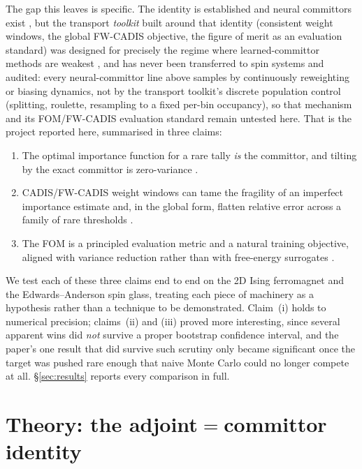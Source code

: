 \documentclass[11pt]{article}
\begin{document}
	The gap this leaves is specific. The identity is established \cite{doob1984, chetrite2015}
	and neural committors exist \cite{li2019, khoo2019, kim2026, trizio2025}, but the transport
	\emph{toolkit} built around that identity (consistent weight windows, the global
	FW-CADIS objective, the figure of merit as an evaluation standard) was designed for
	precisely the regime where learned-committor methods are weakest \cite{wagner1998,
		wagnerfw2014}, and has never been transferred to spin systems and audited: every
	neural-committor line above samples by continuously reweighting or biasing dynamics, not
	by the transport toolkit's discrete population control (splitting, roulette, resampling
	to a fixed per-bin occupancy), so that mechanism and its FOM/FW-CADIS evaluation standard
	remain untested here. That is the project reported here, summarised in three claims:
	\begin{enumerate}[itemsep=2pt]
		\item The optimal importance function for a rare tally \emph{is} the committor, and
		tilting by the exact committor is zero-variance \cite{doob1984, chetrite2015}.
		\item CADIS/FW-CADIS weight windows can tame the fragility of an imperfect importance
		estimate and, in the global form, flatten relative error across a family of rare
		thresholds \cite{wagner1998, wagnerfw2014}.
		\item The FOM is a principled evaluation metric and a natural training objective,
		aligned with variance reduction rather than with free-energy surrogates
		\cite{spanier1969, wanglandau2001}.
	\end{enumerate}
	
	We test each of these three claims end to end on the 2D Ising ferromagnet and the
	Edwards--Anderson spin glass, treating each piece of machinery as a hypothesis rather than
	a technique to be demonstrated. Claim~(i) holds to numerical precision; claims~(ii) and
	(iii) proved more interesting, since several apparent wins did \emph{not} survive a proper
	bootstrap confidence interval, and the paper's one result that did survive such scrutiny
	only became significant once the target was pushed rare enough that naive Monte Carlo
	could no longer compete at all. \S\ref{sec:results} reports every comparison in full.

	\section{Theory: the adjoint$=$committor identity}
	\label{sec:theory}
	
\end{document}
